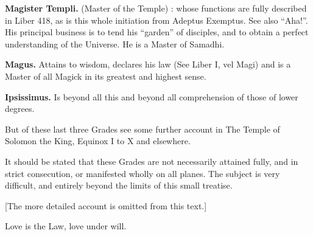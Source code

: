 \textbf{Magister Templi.} \textemdash{} (Master of the Temple) : whose functions are fully described in Liber 418, as is this whole initiation from Adeptus Exemptus. See also \enquote{Aha!}. His principal business is to tend his \enquote{garden} of disciples, and to obtain a perfect understanding of the Universe. He is a Master of Samadhi.

\textbf{Magus.} \textemdash{} Attains to wisdom, declares his law (See Liber I, vel Magi) and is a Master of all Magick in its greatest and
highest sense.

\textbf{Ipsissimus.} \textemdash{} Is beyond all this and beyond all comprehension of those of lower degrees.

But of these last three Grades see some further account in The Temple of Solomon the King, Equinox I to X and elsewhere.

It should be stated that these Grades are not necessarily attained fully, and in strict consecution, or manifested wholly on all planes. The subject is very difficult, and entirely beyond the limits of this small treatise.

[The more detailed account is omitted from this text.]

Love is the Law, love under will.
